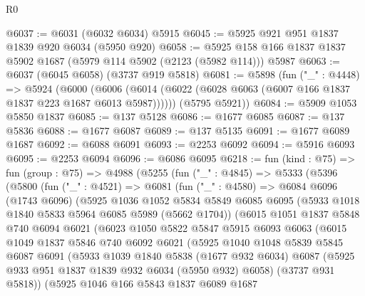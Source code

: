 \begin{lexlean}{R0}
\begin{coremodule}
@6037 := @6031 (@6032 @6034) @5915
@6045 := @5925 @921 @951 @1837 @1839 @920 @6034 (@5950 @920)
@6058 := @5925 @158 @166 @1837 @1837 @5902 @1687 (@5979 @114 @5902 (@2123 (@5982 @114))) @5987
@6063 := @6037 (@6045 @6058) (@3737 @919 @5818)
@6081 := @5898
    (fun ("_" : @4448) =>
    @5924
      (@6000 (@6006 (@6014 (@6022 (@6028 @6063 (@6007 @166 @1837 @1837 @223 @1687 @6013 @5987))))))
      (@5795 @5921))
@6084 := @5909 @1053 @5850 @1837
@6085 := @137 @5128
@6086 := @1677 @6085
@6087 := @137 @5836
@6088 := @1677 @6087
@6089 := @137 @5135
@6091 := @1677 @6089 @1687
@6092 := @6088 @6091
@6093 := @2253 @6092
@6094 := @5916 @6093
@6095 := @2253 @6094
@6096 := @6086 @6095
@6218 := fun (kind : @75) =>
  fun (group : @75) =>
  @4988
    (@5255
      (fun ("_" : @4845) =>
      @5333
        (@5396
          (@5800
            (fun ("_" : @4521) =>
            @6081
              (fun ("_" : @4580) =>
              @6084
                @6096
                (@1743 @6096)
                (@5925
                  @1036
                  @1052
                  @5834
                  @5849
                  @6085
                  @6095
                  (@5933 @1018 @1840 @5833 @5964 @6085 @5989 (@5662 @1704))
                  (@6015
                    @1051
                    @1837
                    @5848
                    @740
                    @6094
                    @6021
                    (@6023
                      @1050
                      @5822
                      @5847
                      @5915
                      @6093
                      @6063
                      (@6015
                        @1049
                        @1837
                        @5846
                        @740
                        @6092
                        @6021
                        (@5925
                          @1040
                          @1048
                          @5839
                          @5845
                          @6087
                          @6091
                          (@5933
                            @1039
                            @1840
                            @5838
                            (@1677 @932 @6034)
                            @6087
                            (@5925 @933 @951 @1837 @1839 @932 @6034 (@5950 @932) @6058)
                            (@3737 @931 @5818))
                          (@5925
                            @1046
                            @166
                            @5843
                            @1837
                            @6089
                            @1687

\end{coremodule}
\end{lexlean}
